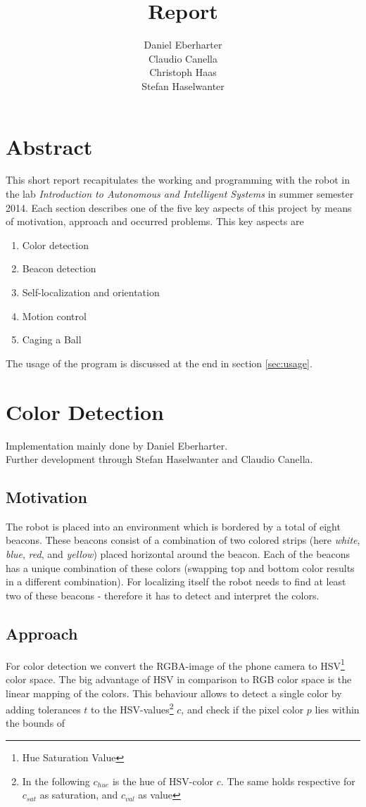 \documentclass[703031]{iisreport}
\title{\textbf{Report}}
\author{Daniel Eberharter\\ Claudio Canella\\ Christoph Haas\\ Stefan Haselwanter}
\begin{document}
\maketitle

\section{Abstract}
This short report recapitulates the working and programming with the robot in the lab \emph{Introduction to Autonomous and Intelligent Systems} in summer semester 2014. Each section describes one of the five key aspects of this project by means of motivation, approach and occurred problems. This key aspects are
\begin{enumerate}
	\item Color detection
	\item Beacon detection
	\item Self-localization and orientation
	\item Motion control
	\item Caging a Ball\\
\end{enumerate}
The usage of the program is discussed at the end in section \ref{sec:usage}.

\section{Color Detection}
Implementation mainly done by Daniel Eberharter.\\
Further development through Stefan Haselwanter and Claudio Canella.

\subsection{Motivation}
The robot is placed into an environment which is bordered by a total of eight beacons. These beacons consist of a combination of two colored strips (here \emph{white}, \emph{blue}, \emph{red}, and \emph{yellow}) placed horizontal around the beacon. Each of the beacons has a unique combination of these colors (swapping top and bottom color results in a different combination).
For localizing itself the robot needs to find at least two of these beacons - therefore it has to detect and interpret the colors.

\subsection{Approach}
For color detection we convert the RGBA-image of the phone camera to HSV\footnote{Hue Saturation Value} color space. The big advantage of HSV in comparison to RGB color space is the linear mapping of the colors. This behaviour allows to detect a single color by adding tolerances $t$ to the HSV-values\footnote{In the following $c_{hue}$ is the hue of HSV-color $c$. The same holds respective for $c_{sat}$ as saturation, and $c_{val}$ as value} $c$, and check if the pixel color $p$ lies within the bounds of 
\end{document}
